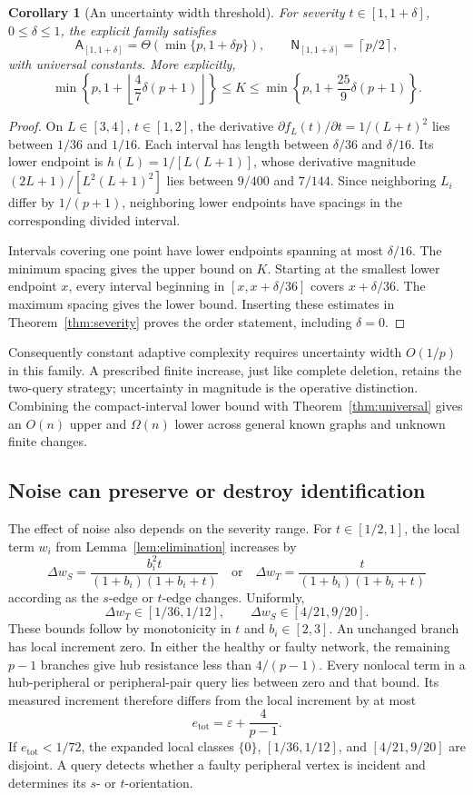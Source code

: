 \documentclass[11pt,letterpaper]{article}
\newtheorem{corollary}[theorem]{Corollary}
\newcommand{\ceil}[1]{\left\lceil #1\right\rceil}
\newcommand{\floor}[1]{\left\lfloor #1\right\rfloor}
\newcommand{\A}{\mathsf A}
\newcommand{\N}{\mathsf N}
\begin{document}
\begin{corollary}[An uncertainty width threshold]\label{cor:width}
For severity $t\in[1,1+\delta]$, $0\le\delta\le1$, the explicit family satisfies
\[
 \A_{[1,1+\delta]}=\Theta(\min\{p,1+\delta p\}),
 \qquad \N_{[1,1+\delta]}=\ceil{p/2},
\]
with universal constants. More explicitly,
\[
 \min\!\left\{p,1+\floor{\frac47\delta(p+1)}\right\}
 \le K\le
 \min\!\left\{p,1+\frac{25}{9}\delta(p+1)\right\}.
\]
\end{corollary}
\begin{proof}
On $L\in[3,4]$, $t\in[1,2]$, the derivative $\partial f_L(t)/\partial t=1/(L+t)^2$ lies between $1/36$ and $1/16$. Each interval has length between $\delta/36$ and $\delta/16$. Its lower endpoint is $h(L)=1/[L(L+1)]$, whose derivative magnitude $(2L+1)/[L^2(L+1)^2]$ lies between $9/400$ and $7/144$. Since neighboring $L_i$ differ by $1/(p+1)$, neighboring lower endpoints have spacings in the corresponding divided interval.

Intervals covering one point have lower endpoints spanning at most $\delta/16$. The minimum spacing gives the upper bound on $K$. Starting at the smallest lower endpoint $x$, every interval beginning in $[x,x+\delta/36]$ covers $x+\delta/36$. The maximum spacing gives the lower bound. Inserting these estimates in Theorem~\ref{thm:severity} proves the order statement, including $\delta=0$.
\end{proof}

Consequently constant adaptive complexity requires uncertainty width $O(1/p)$ in this family. A prescribed finite increase, just like complete deletion, retains the two-query strategy; uncertainty in magnitude is the operative distinction. Combining the compact-interval lower bound with Theorem~\ref{thm:universal} gives an $O(n)$ upper and $\Omega(n)$ lower across general known graphs and unknown finite changes.

\subsection{Noise can preserve or destroy identification}
The effect of noise also depends on the severity range. For $t\in[1/2,1]$, the local term $w_i$ from Lemma~\ref{lem:elimination} increases by
\[
 \Delta w_S=\frac{b_i^2t}{(1+b_i)(1+b_i+t)}
 \quad\text{or}\quad
 \Delta w_T=\frac{t}{(1+b_i)(1+b_i+t)}
\]
according as the $s$-edge or $t$-edge changes. Uniformly,
\[
 \Delta w_T\in[1/36,1/12],\qquad
 \Delta w_S\in[4/21,9/20].
\]
These bounds follow by monotonicity in $t$ and $b_i\in[2,3]$. An unchanged branch has local increment zero. In either the healthy or faulty network, the remaining $p-1$ branches give hub resistance less than $4/(p-1)$. Every nonlocal term in a hub-peripheral or peripheral-pair query lies between zero and that bound. Its measured increment therefore differs from the local increment by at most
\[
 e_{\mathrm{tot}}=\varepsilon+\frac4{p-1}.
\]
If $e_{\mathrm{tot}}<1/72$, the expanded local classes $\{0\}$, $[1/36,1/12]$, and $[4/21,9/20]$ are disjoint. A query detects whether a faulty peripheral vertex is incident and determines its $s$- or $t$-orientation.
\end{document}
